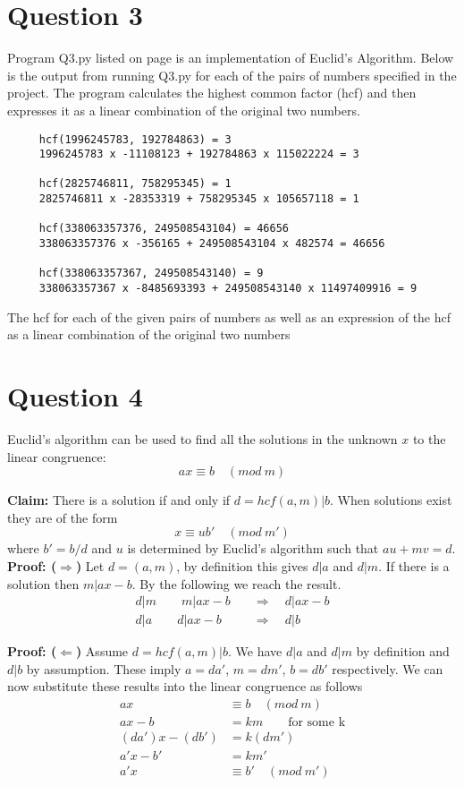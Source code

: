 \documentclass[a4paper]{article}
\newcommand{\m}{(mod \ m)}
\newcommand{\mm}{(mod \ m')}
\begin{document}
\section*{Question 3}
Program Q3.py listed on page \pageref{PQ3} is an implementation of Euclid's Algorithm. Below is the output from running Q3.py for each of the pairs of numbers specified in the project. The program calculates the highest common factor (hcf) and then expresses it as a linear combination of the original two numbers.
\begin{table}[H]
\begin{verbatim}
     hcf(1996245783, 192784863) = 3
     1996245783 x -11108123 + 192784863 x 115022224 = 3 
     
     hcf(2825746811, 758295345) = 1
     2825746811 x -28353319 + 758295345 x 105657118 = 1 
     
     hcf(338063357376, 249508543104) = 46656
     338063357376 x -356165 + 249508543104 x 482574 = 46656 
     
     hcf(338063357367, 249508543140) = 9
     338063357367 x -8485693393 + 249508543140 x 11497409916 = 9
\end{verbatim}
\caption{The hcf for each of the given pairs of numbers as well as an expression of the hcf as a linear combination of the original two numbers}
\end{table}

\section*{Question 4}
Euclid's algorithm can be used to find all the solutions in the unknown $x$ to the linear congruence:
\[ ax \equiv b \quad \m \]

\textbf{Claim:} There is a solution if and only if $d = hcf(a,m) | b$. When solutions exist they are of the form
\[ x \equiv ub' \quad \mm \]
where $b' = b/d$ and $u$ is determined by Euclid's algorithm such that $au+mv = d$.
\bigbreak
\textbf{Proof: ($\Rightarrow$)}
Let $d=(a,m)$, by definition this gives $d|a$ and $d|m$. If there is a solution then $m|ax-b$. By the following we reach the result.
\begin{align*}
d|m \qquad m|ax-b \quad &\Rightarrow \quad d|ax-b \\
d|a \qquad d|ax-b \quad &\Rightarrow \quad d|b
\end{align*}

\textbf{Proof: ($\Leftarrow$)}
Assume $d = hcf(a,m) | b$. We have $d|a$ and $d|m$ by definition and $d|b$ by assumption. These imply $a = da'$, $m = dm'$, $b = db'$ respectively. We can now substitute these results into the linear congruence as follows
\begin{align*}
ax &\equiv b \quad \m \\
ax-b &= km \qquad \text{for some k} \\
(da')x-(db') &= k(dm') \\
a'x - b' &= km' \\
a'x &\equiv b' \quad \mm \tag{4.1}
\end{align*}
\end{document}
